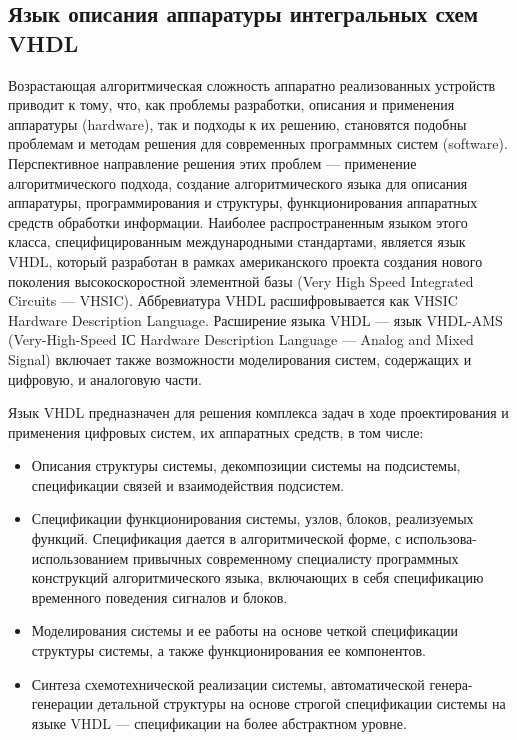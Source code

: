 \subsection{Язык описания аппаратуры интегральных схем VHDL}
\label{sub:techs:vhdl}
Возрастающая алгоритмическая сложность аппаратно реализованных устройств приводит к тому, что, как проблемы разработки, описания и применения аппаратуры (hardware), так и подходы к их решению, становятся подобны проблемам и методам решения для современных программных систем (software). Перспективное направление решения этих проблем — применение алгоритмического подхода, создание алгоритмического языка для описания аппаратуры, программирования и структуры, функционирования аппаратных средств обработки информации. Наиболее распространенным языком этого класса, специфицированным международными стандартами, является язык VHDL, который разработан в рамках американского проекта создания нового поколения высокоскоростной элементной базы (Very High Speed Integrated Circuits — VHSIC). Аббревиатура VHDL расшифровывается как VHSIC Hardware Description Language. Расширение языка VHDL — язык VHDL-AMS (Very-High-Speed IС Hardware Description Language — Analog and Mixed Signal) включает также возможности моделирования систем, содержащих и цифровую, и аналоговую части.~\cite{suvorova_vhdl, ivchenko_vhdl}

Язык VHDL предназначен для решения комплекса задач в ходе проектирования и применения цифровых систем, их аппаратных средств, в том числе:
\begin{itemize}
  \item  Описания структуры системы, декомпозиции системы на подсистемы,
спецификации связей и взаимодействия подсистем.
  \item  Спецификации функционирования системы, узлов, блоков, реализуемых
функций. Спецификация дается в алгоритмической форме, с использова-
использованием привычных современному специалисту программных конструкций
алгоритмического языка, включающих в себя спецификацию временного
поведения сигналов и блоков.
  \item  Моделирования системы и ее работы на основе четкой спецификации
структуры системы, а также функционирования ее компонентов.
  \item  Синтеза схемотехнической реализации системы, автоматической генера-
генерации детальной структуры на основе строгой спецификации системы на
языке VHDL — спецификации на более абстрактном уровне.
\end{itemize}

